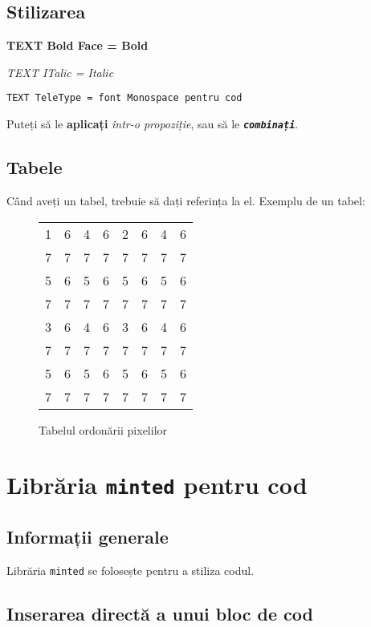 \documentclass[a4paper,12pt]{report}
\begin{document}
\subsection{Stilizarea}

\textbf{TEXT Bold Face = Bold}

\textit{TEXT ITalic = Italic}

\texttt{TEXT TeleType = font Monospace pentru cod}

Puteți să le \textbf{aplicați} \textit{într-o propoziție}, sau să le \texttt{\textit{\textbf{combinați}}}.


\subsection{Tabele}

Când aveți un tabel, trebuie să dați referința la el.
Exemplu de un tabel: 

\begin{figure}[!ht]
\centering
\begin{tabular}{c c c c c c c c}
    1 & 6 & 4 & 6 & 2 & 6 & 4 & 6 \\
    7 & 7 & 7 & 7 & 7 & 7 & 7 & 7 \\
    5 & 6 & 5 & 6 & 5 & 6 & 5 & 6 \\
    7 & 7 & 7 & 7 & 7 & 7 & 7 & 7 \\
    3 & 6 & 4 & 6 & 3 & 6 & 4 & 6 \\
    7 & 7 & 7 & 7 & 7 & 7 & 7 & 7 \\
    5 & 6 & 5 & 6 & 5 & 6 & 5 & 6 \\
    7 & 7 & 7 & 7 & 7 & 7 & 7 & 7 \\
\end{tabular}
\caption{Tabelul ordonării pixelilor}
\label{fig:pixel_order_table}
\end{figure}


\section{Librăria \texttt{minted} pentru cod}

\subsection{Informații generale}

Librăria \texttt{minted} se folosește pentru a stiliza codul.

\subsection{Inserarea directă a unui bloc de cod}
\end{document}
